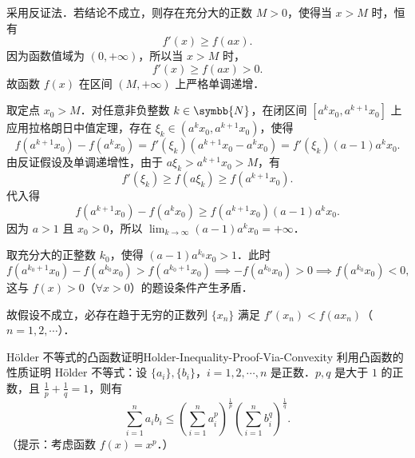 \begin{myproof}
    采用反证法．若结论不成立，则存在充分大的正数 $M > 0$，使得当 $x > M$ 时，恒有
    \begin{equation}
        f'(x) \geqslant f(ax).
    \end{equation}
    因为函数值域为 $(0, +\infty)$，所以当 $x > M$ 时，
    \begin{equation}
        f'(x) \geqslant f(ax) > 0.
    \end{equation}
    故函数 $f(x)$ 在区间 $(M, +\infty)$ 上严格单调递增．

    取定点 $x_0 > M$．对任意非负整数 $k \in \symbb{N}$，在闭区间 $[a^k x_0, a^{k+1} x_0]$ 上应用拉格朗日中值定理，存在 $\xi_k \in (a^k x_0, a^{k+1} x_0)$，使得
    \begin{equation}
        f(a^{k+1} x_0) - f(a^k x_0) = f'(\xi_k)(a^{k+1} x_0 - a^k x_0) = f'(\xi_k)(a - 1)a^k x_0.
    \end{equation}
    由反证假设及单调递增性，由于 $a\xi_k > a^{k+1} x_0 > M$，有
    \begin{equation}
        f'(\xi_k) \geqslant f(a\xi_k) \geqslant f(a^{k+1} x_0).
    \end{equation}
    代入得
    \begin{equation}
        f(a^{k+1} x_0) - f(a^k x_0) \geqslant f(a^{k+1} x_0)(a - 1)a^k x_0.
    \end{equation}
    因为 $a > 1$ 且 $x_0 > 0$，所以 $\lim_{k\to\infty} (a - 1)a^k x_0 = +\infty$．

    取充分大的正整数 $k_0$，使得 $(a - 1)a^{k_0} x_0 > 1$．此时
    \begin{equation}
        f(a^{k_0+1} x_0) - f(a^{k_0} x_0) > f(a^{k_0+1} x_0) \implies -f(a^{k_0} x_0) > 0 \implies f(a^{k_0} x_0) < 0,
    \end{equation}
    这与 $f(x) > 0$（$\forall x > 0$）的题设条件产生矛盾．

    故假设不成立，必存在趋于无穷的正数列 $\{x_n\}$ 满足 $f'(x_n) < f(ax_n)$（$n = 1, 2, \cdots$）．
\end{myproof}

\begin{problem}{Hölder 不等式的凸函数证明}{Holder-Inequality-Proof-Via-Convexity}
    利用凸函数的性质证明 Hölder 不等式：设 $\{a_i\}, \{b_i\}$，$i = 1, 2, \cdots, n$ 是正数．$p, q$ 是大于 $1$ 的正数，且 $\frac{1}{p} + \frac{1}{q} = 1$，则有
    \begin{equation}
        \sum_{i=1}^n a_i b_i \leqslant \left( \sum_{i=1}^n a_i^p \right)^{\frac{1}{p}} \left( \sum_{i=1}^n b_i^q \right)^{\frac{1}{q}}.
    \end{equation}
    （提示：考虑函数 $f(x) = x^p$．）
\end{problem}

